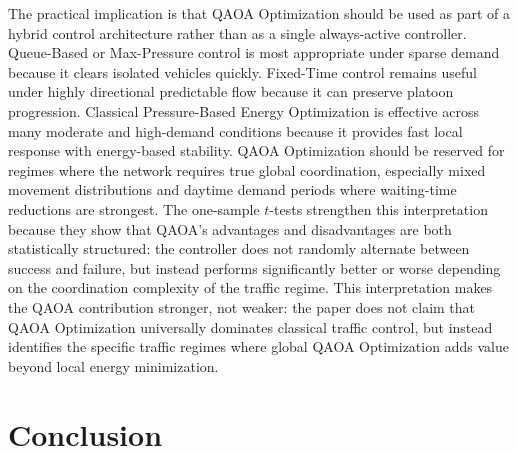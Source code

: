 \documentclass[12pt]{article}
\begin{document}
The practical implication is that QAOA Optimization should be used as part of a hybrid control architecture rather than as a single always-active controller. Queue-Based or Max-Pressure control is most appropriate under sparse demand because it clears isolated vehicles quickly. Fixed-Time control remains useful under highly directional predictable flow because it can preserve platoon progression. Classical Pressure-Based Energy Optimization is effective across many moderate and high-demand conditions because it provides fast local response with energy-based stability. QAOA Optimization should be reserved for regimes where the network requires true global coordination, especially mixed movement distributions and daytime demand periods where waiting-time reductions are strongest. The one-sample $t$-tests strengthen this interpretation because they show that QAOA's advantages and disadvantages are both statistically structured: the controller does not randomly alternate between success and failure, but instead performs significantly better or worse depending on the coordination complexity of the traffic regime. This interpretation makes the QAOA contribution stronger, not weaker: the paper does not claim that QAOA Optimization universally dominates classical traffic control, but instead identifies the specific traffic regimes where global QAOA Optimization adds value beyond local energy minimization.

\section{Conclusion}
\end{document}
